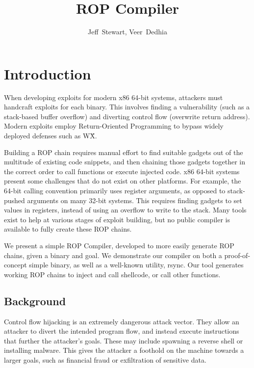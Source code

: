 \documentclass[journal]{IEEEtran}
\begin{document}
%
\title{ROP Compiler}

\author{Jeff~Stewart,
        Veer~Dedhia}



\maketitle

\section{Introduction}

When developing exploits for modern x86 64-bit systems, attackers must handcraft
exploits for each binary. This involves finding a vulnerability (such
as a stack-based buffer overflow) and diverting control flow (overwrite return
address). Modern exploits employ Return-Oriented Programming to bypass widely
deployed defenses such as W\^X.

Building a ROP chain requires manual effort to find suitable gadgets out of the
multitude of existing code snippets, and then chaining those gadgets together in
the correct order to call functions or execute injected code. x86 64-bit systems
present some challenges that do not exist on other platforms. For example, the
64-bit calling convention primarily uses register arguments, as opposed to
stack-pushed arguments on many 32-bit systems. This requires finding gadgets to
set values in registers, instead of using an overflow to write to the stack.
Many tools exist to help at various stages of exploit building, but no public
compiler is available to fully create these ROP chains.

We present a simple ROP Compiler, developed to more easily generate ROP chains,
given a binary and goal. We demonstrate our compiler on both a proof-of-concept
simple binary, as well as a well-known utility, rsync. Our tool generates
working ROP chains to inject and call shellcode, or call other functions.

\subsection{Background}
Control flow hijacking is an extremely dangerous attack vector. They allow an
attacker to divert the intended program flow, and instead execute instructions
that further the attacker's goals. These may include spawning a reverse shell or
installing malware. This gives the attacker a foothold on the machine towards a
larger goals, such as financial fraud or exfiltration of sensitive data.
\end{document}
